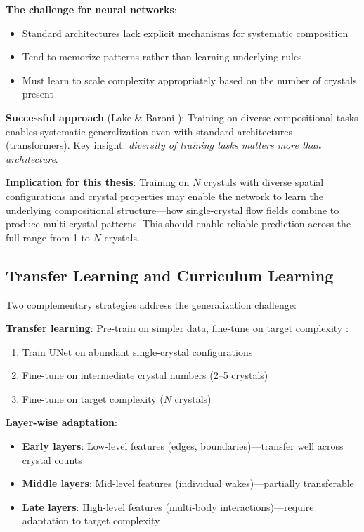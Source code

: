 \textbf{The challenge for neural networks}:
\begin{itemize}
    \item Standard architectures lack explicit mechanisms for systematic composition
    \item Tend to memorize patterns rather than learning underlying rules
    \item Must learn to scale complexity appropriately based on the number of crystals present
\end{itemize}

\textbf{Successful approach} (Lake \& Baroni \cite{lake2023systematic}): Training on diverse compositional tasks enables systematic generalization even with standard architectures (transformers). Key insight: \textit{diversity of training tasks matters more than architecture}.

\textbf{Implication for this thesis}: Training on $N$ crystals with diverse spatial configurations and crystal properties may enable the network to learn the underlying compositional structure---how single-crystal flow fields combine to produce multi-crystal patterns. This should enable reliable prediction across the full range from 1 to $N$ crystals.

\subsection{Transfer Learning and Curriculum Learning}

Two complementary strategies address the generalization challenge:

\textbf{Transfer learning}: Pre-train on simpler data, fine-tune on target complexity \cite{pellegrin2022transfer}:
\begin{enumerate}
    \item Train UNet on abundant single-crystal configurations
    \item Fine-tune on intermediate crystal numbers (2--5 crystals)
    \item Fine-tune on target complexity ($N$ crystals)
\end{enumerate}

\textbf{Layer-wise adaptation}:
\begin{itemize}
    \item \textbf{Early layers}: Low-level features (edges, boundaries)---transfer well across crystal counts
    \item \textbf{Middle layers}: Mid-level features (individual wakes)---partially transferable
    \item \textbf{Late layers}: High-level features (multi-body interactions)---require adaptation to target complexity
\end{itemize}

